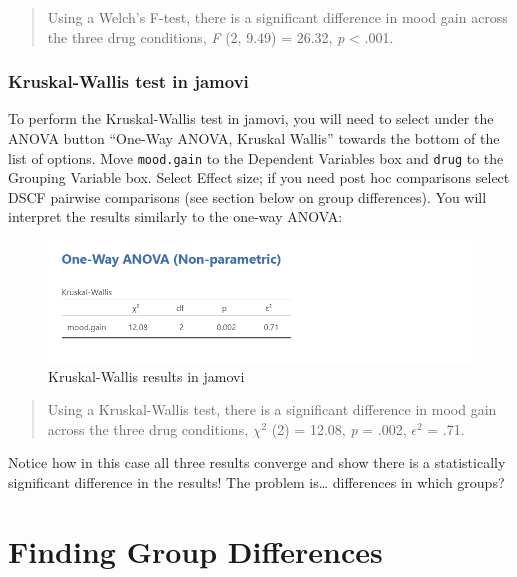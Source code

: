\documentclass[
]{book}
\begin{document}
\begin{quote}
Using a Welch's F-test, there is a significant difference in mood gain across the three drug conditions, \emph{F} (2, 9.49) = 26.32, \emph{p} \textless{} .001.
\end{quote}

\hypertarget{kruskal-wallis-test-in-jamovi}{%
\subsubsection{Kruskal-Wallis test in jamovi}\label{kruskal-wallis-test-in-jamovi}}

To perform the Kruskal-Wallis test in jamovi, you will need to select under the ANOVA button ``One-Way ANOVA, Kruskal Wallis'' towards the bottom of the list of options. Move \texttt{mood.gain} to the Dependent Variables box and \texttt{drug} to the Grouping Variable box. Select Effect size; if you need post hoc comparisons select DSCF pairwise comparisons (see section below on group differences). You will interpret the results similarly to the one-way ANOVA:

\begin{figure}

{\centering \includegraphics[width=1\linewidth]{images/04_one-way-anova/one-way_results_Kruskal} 

}

\caption{Kruskal-Wallis results in jamovi}\label{fig:unnamed-chunk-7}
\end{figure}

\begin{quote}
Using a Kruskal-Wallis test, there is a significant difference in mood gain across the three drug conditions, \(\chi^2\) (2) = 12.08, \emph{p} = .002, \(\epsilon^2\) = .71.
\end{quote}

Notice how in this case all three results converge and show there is a statistically significant difference in the results! The problem is\ldots{} differences in which groups?

\hypertarget{finding-group-differences}{%
\section{Finding Group Differences}\label{finding-group-differences}}
\end{document}
